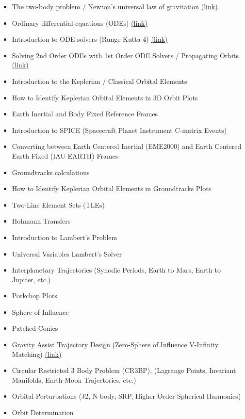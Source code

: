 \documentclass{article}
\begin{document}
\begin{itemize}
	\item The two-body problem / Newton's universal law of gravitation \color{cyan}\href{https://youtu.be/nJ_f1h49jfM}{(link)} \color{white}
	\item Ordinary differential equations (ODEs) \color{cyan}\href{https://youtu.be/8-SyHZb7w40}{(link)} \color{white}
	\item Introduction to ODE solvers (Runge-Kutta 4) \color{cyan}\href{https://youtu.be/VrH6JhIFmcA}{(link)} \color{white}
	\item Solving 2nd Order ODEs with 1st Order ODE Solvers / Propagating Orbits \color{cyan}\href{https://youtu.be/TzX6bg3Kc0E}{(link)} \color{white}
	\item Introduction to the Keplerian / Classical Orbital Elements
	\item How to Identify Keplerian Orbital Elements in 3D Orbit Plots
	\item Earth Inertial and Body Fixed Reference Frames
	\item Introduction to SPICE (Spacecraft Planet Instrument C-matrix Events)
	\item Converting between Earth Centered Inertial (EME2000) and Earth Centered Earth Fixed (IAU EARTH) Frames
	\item Groundtracks calculations
	\item How to Identify Keplerian Orbital Elements in Groundtracks Plots
	\item Two-Line Element Sets (TLEs)
	\item Hohmann Transfers
	\item Introduction to Lambert's Problem
	\item Universal Variables Lambert's Solver
	\item Interplanetary Trajectories (Synodic Periods, Earth to Mars, Earth to Jupiter, etc.)
	\item Porkchop Plots
	\item Sphere of Influence
	\item Patched Conics
	\item Gravity Assist Trajectory Design (Zero-Sphere of Influence V-Infinity Matching) \color{cyan}\href{https://youtu.be/rNpnzNKQrNg}{(link)} \color{white}
	\item Circular Restricted 3 Body Problem (CR3BP), (Lagrange Points, Invariant Manifolds, Earth-Moon Trajectories, etc.)
	\item Orbital Perturbations (J2, N-body, SRP, Higher Order Spherical Harmonics)
	\item Orbit Determination
\end{itemize}
\end{document}
